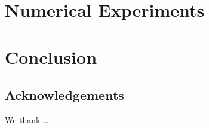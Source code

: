 \documentclass{article}
\begin{document}
\section{Numerical Experiments}


\section{Conclusion}


\subsection*{Acknowledgements}
We thank \ldots




\end{document}
